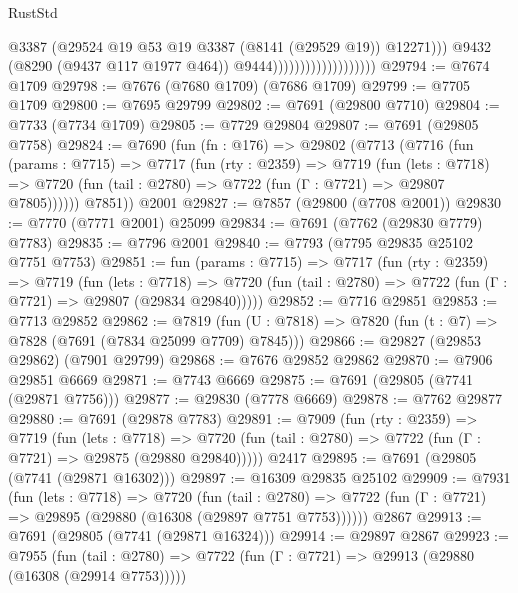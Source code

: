 \begin{lexlean}{RustStd}
\begin{coremodule}
                                              @3387
                                              (@29524
                                                @19
                                                @53
                                                @19
                                                @3387
                                                (@8141 (@29529 @19))
                                                @12271)))
                                          @9432
                                          (@8290 (@9437 @117 @1977 @464))
                                          @9444)))))))))))))))))))
@29794 := @7674 @1709
@29798 := @7676 (@7680 @1709) (@7686 @1709)
@29799 := @7705 @1709
@29800 := @7695 @29799
@29802 := @7691 (@29800 @7710)
@29804 := @7733 (@7734 @1709)
@29805 := @7729 @29804
@29807 := @7691 (@29805 @7758)
@29824 := @7690
    (fun (fn : @176) =>
    @29802
      (@7713
        (@7716
          (fun (params : @7715) =>
          @7717
            (fun (rty : @2359) =>
            @7719
              (fun (lets : @7718) =>
              @7720 (fun (tail : @2780) => @7722 (fun (Γ : @7721) => @29807 @7805))))))
        @7851))
    @2001
@29827 := @7857 (@29800 (@7708 @2001))
@29830 := @7770 (@7771 @2001) @25099
@29834 := @7691 (@7762 (@29830 @7779) @7783)
@29835 := @7796 @2001
@29840 := @7793 (@7795 @29835 @25102 @7751 @7753)
@29851 := fun (params : @7715) =>
  @7717
    (fun (rty : @2359) =>
    @7719
      (fun (lets : @7718) =>
      @7720 (fun (tail : @2780) => @7722 (fun (Γ : @7721) => @29807 (@29834 @29840)))))
@29852 := @7716 @29851
@29853 := @7713 @29852
@29862 := @7819
    (fun (U : @7818) => @7820 (fun (t : @7) => @7828 (@7691 (@7834 @25099 @7709) @7845)))
@29866 := @29827 (@29853 @29862) (@7901 @29799)
@29868 := @7676 @29852 @29862
@29870 := @7906 @29851 @6669
@29871 := @7743 @6669
@29875 := @7691 (@29805 (@7741 (@29871 @7756)))
@29877 := @29830 (@7778 @6669)
@29878 := @7762 @29877
@29880 := @7691 (@29878 @7783)
@29891 := @7909
    (fun (rty : @2359) =>
    @7719
      (fun (lets : @7718) =>
      @7720 (fun (tail : @2780) => @7722 (fun (Γ : @7721) => @29875 (@29880 @29840)))))
    @2417
@29895 := @7691 (@29805 (@7741 (@29871 @16302)))
@29897 := @16309 @29835 @25102
@29909 := @7931
    (fun (lets : @7718) =>
    @7720
      (fun (tail : @2780) =>
      @7722 (fun (Γ : @7721) => @29895 (@29880 (@16308 (@29897 @7751 @7753))))))
    @2867
@29913 := @7691 (@29805 (@7741 (@29871 @16324)))
@29914 := @29897 @2867
@29923 := @7955
    (fun (tail : @2780) => @7722 (fun (Γ : @7721) => @29913 (@29880 (@16308 (@29914 @7753)))))

\end{coremodule}
\end{lexlean}

